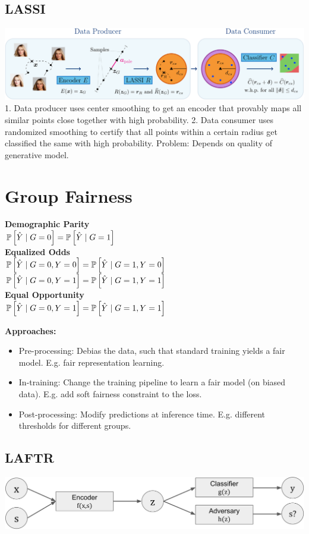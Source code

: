 \subsection*{LASSI}
\includegraphics[width=1\columnwidth]{img/lassi.png}
1. Data producer uses center smoothing to get an encoder that provably maps all similar points close together with high probability. 2. Data consumer uses randomized smoothing to certify that all points within a certain radius get classified the same with high probability. Problem: Depends on quality of generative model.

\section{Group Fairness}
\textbf{Demographic Parity}\\
$\P\left[\hat Y\mid G=0\right]=\P\left[\hat Y\mid G=1\right]$\\
\textbf{Equalized Odds}\\
$\P\left[\hat Y\mid G=0,Y=0\right]=\P\left[\hat Y\mid G=1,Y=0\right]$\\
$\P\left[\hat Y\mid G=0,Y=1\right]=\P\left[\hat Y\mid G=1,Y=1\right]$\\
\textbf{Equal Opportunity}\\
$\P\left[\hat Y\mid G=0,Y=1\right]=\P\left[\hat Y\mid G=1,Y=1\right]$

\textbf{Approaches:}
\begin{itemize}
    \item Pre-processing: Debias the data, such that standard training yields a fair model. E.g. fair representation learning.
    \item In-training: Change the training pipeline to learn a fair model (on biased data). E.g. add soft fairness constraint to the loss.
    \item Post-processing: Modify predictions at inference time. E.g. different thresholds for different groups.
\end{itemize}

\subsection*{LAFTR}
\includegraphics[width=.8\columnwidth]{img/laftr.png}

